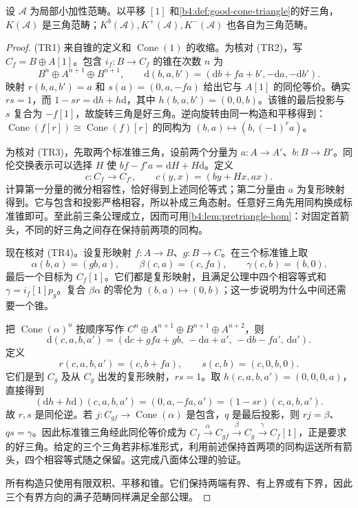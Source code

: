 \begin{theorem}\label{b4:thm:homotopy-triangulated}
设 \(\mathcal A\) 为局部小加性范畴。以平移 \([1]\) 和\cref{b4:def:good-cone-triangle}的好三角，\(K(\mathcal A)\) 是三角范畴；\(K^b(\mathcal A),K^+(\mathcal A),K^-(\mathcal A)\) 也各自为三角范畴。
\end{theorem}
\begin{proof}
(TR1) 来自锥的定义和 \(\operatorname{Cone}(1)\) 的收缩。为核对 (TR2)，写 \(C_f=B\oplus A[1]\)。包含 \(i_f:B\to C_f\) 的锥在次数 \(n\) 为
\[
 B^n\oplus A^{n+1}\oplus B^{n+1},\qquad
 \mathrm{d}(b,a,b')=(\mathrm{d}b+fa+b',-\mathrm{d}a,-\mathrm{d}b').
\]
映射 \(r(b,a,b')=a\) 和 \(s(a)=(0,a,-fa)\) 给出它与 \(A[1]\) 的同伦等价。确实 \(rs=1\)，而 \(1-sr=\mathrm{d}h+h\mathrm{d}\)，其中 \(h(b,a,b')=(0,0,b)\)。该锥的最后投影与 \(s\) 复合为 \(-f[1]\)，故旋转三角是好三角。逆向旋转由同一构造和平移得到：\(\operatorname{Cone}(f[r])\cong\operatorname{Cone}(f)[r]\) 的同构为 \((b,a)\mapsto(b,(-1)^ra)\)。

为核对 (TR3)，先取两个标准锥三角，设前两个分量为 \(a:A\to A'\)、\(b:B\to B'\)。同伦交换表示可以选择 \(H\) 使
\(bf-f'a=\mathrm{d}H+H\mathrm{d}\)。定义
\[
 c:C_f\longrightarrow C_{f'},\qquad c(y,x)=(by+Hx,ax).
\]
计算第一分量的微分相容性，恰好得到上述同伦等式；第二分量由 \(a\) 为复形映射得到。它与包含和投影严格相容，所以补成三角态射。任意好三角先用同构换成标准锥即可。至此前三条公理成立，因而可用\cref{b4:lem:pretriangle-hom}：对固定首箭头，不同的好三角之间存在保持前两项的同构。

现在核对 (TR4)。设复形映射 \(f:A\to B\)、\(g:B\to C\)。在三个标准锥上取
\[
 \alpha(b,a)=(gb,a),\qquad
 \beta(c,a)=(c,fa),\qquad
 \gamma(c,b)=(b,0).
\]
最后一个目标为 \(C_f[1]\)。它们都是复形映射，且满足公理中四个相容等式和 \(\gamma=i_f[1]p_g\)。复合 \(\beta\alpha\) 的零伦为 \((b,a)\mapsto(0,b)\)；这一步说明为什么中间还需要一个锥。

把 \(\operatorname{Cone}(\alpha)^n\) 按顺序写作
\(C^n\oplus A^{n+1}\oplus B^{n+1}\oplus A^{n+2}\)，则
\[
 \mathrm{d}(c,a,b,a')=(\mathrm{d}c+gf a+gb,\,-\mathrm{d}a+a',\,-\mathrm{d}b-fa',\,\mathrm{d}a').
\]
定义
\[
 r(c,a,b,a')=(c,b+fa),\qquad s(c,b)=(c,0,b,0).
\]
它们是到 \(C_g\) 及从 \(C_g\) 出发的复形映射，\(rs=1\)。取 \(h(c,a,b,a')=(0,0,0,a)\)，直接得到
\[
 (\mathrm{d}h+h\mathrm{d})(c,a,b,a')=(0,a,-fa,a')=(1-sr)(c,a,b,a').
\]
故 \(r,s\) 是同伦逆。若 \(j:C_{gf}\to\operatorname{Cone}(\alpha)\) 是包含，\(q\) 是最后投影，则 \(rj=\beta\)、\(qs=\gamma\)。因此标准锥三角经此同伦等价成为
\(C_f\xrightarrow{\alpha}C_{gf}\xrightarrow{\beta}C_g\xrightarrow{\gamma}C_f[1]\)，正是要求的好三角。给定的三个三角若非标准形式，利用前述保持首两项的同构运送所有箭头，四个相容等式随之保留。这完成八面体公理的验证。

所有构造只使用有限双积、平移和锥。它们保持两端有界、有上界或有下界，因此三个有界方向的满子范畴同样满足全部公理。
\end{proof}

